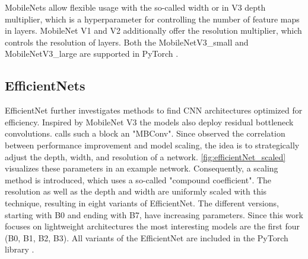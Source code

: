 MobileNets allow flexible usage with the so-called width or in V3 depth multiplier, which is a hyperparameter for controlling the number of feature maps in layers.
MobileNet V1 and V2 additionally offer the resolution multiplier, which controls the resolution of layers.
Both the MobileNetV3\_small and MobileNetV3\_large are supported in PyTorch \cite{pytorchmobilenetv3}.

\subsection{EfficientNets}

EfficientNet \cite{EfficientNet} further investigates methods to find CNN architectures optimized for efficiency.
Inspired by MobileNet V3 the models also deploy residual bottleneck convolutions.
\cite{EfficientNet} calls such a block an "MBConv".
Since \cite{EfficientNet} observed the correlation between performance improvement and model scaling, the idea is to strategically adjust the depth, width, and resolution of a network.
\autoref{fig:efficientNet_scaled} visualizes these parameters in an example network.
Consequently, a scaling method is introduced, which uses a so-called "compound coefficient".
The resolution as well as the depth and width are uniformly scaled with this technique, resulting in eight variants of EfficientNet.
The different versions, starting with B0 and ending with B7, have increasing parameters.
Since this work focuses on lightweight architectures the most interesting models are the first four (B0, B1, B2, B3).
All variants of the EfficientNet are included in the PyTorch library \cite{pytorchefficientNets}.



